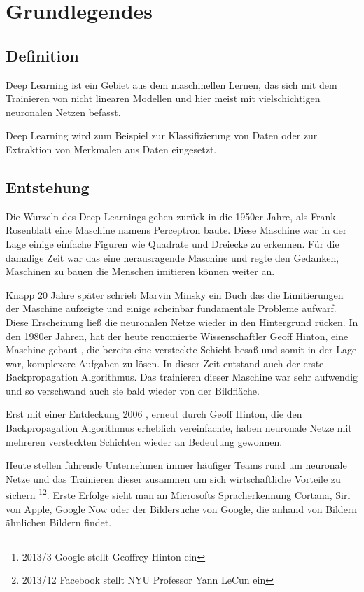 \chapter{Grundlegendes}
\label{cha:grundlegendes}

\section{Definition}

Deep Learning ist ein Gebiet aus dem maschinellen Lernen, das sich mit dem Trainieren von nicht linearen Modellen und hier meist mit vielschichtigen neuronalen Netzen befasst. 

Deep Learning wird zum Beispiel zur Klassifizierung von Daten oder zur Extraktion von Merkmalen aus Daten eingesetzt.

\section{Entstehung}
\label{cha:entstehung}

Die Wurzeln des Deep Learnings gehen zurück in die 1950er Jahre, als Frank Rosenblatt eine Maschine namens Perceptron \citep{Perceptron} baute. Diese Maschine war in der Lage einige einfache Figuren wie Quadrate und Dreiecke zu erkennen. Für die damalige Zeit war das eine herausragende Maschine und regte den Gedanken, Maschinen zu bauen die Menschen imitieren können weiter an.

Knapp 20 Jahre später schrieb Marvin Minsky \citep{PerceptronsMinsky} ein Buch das die Limitierungen der Maschine aufzeigte und einige scheinbar fundamentale Probleme aufwarf. Diese Erscheinung ließ die neuronalen Netze wieder in den Hintergrund rücken.
In den 1980er Jahren, hat der heute renomierte Wissenschaftler Geoff Hinton, eine Maschine gebaut \citep{BackpropagationEarly}, die bereits eine versteckte Schicht besaß und somit in der Lage war, komplexere Aufgaben zu lösen. In dieser Zeit entstand auch der erste Backpropagation Algorithmus. %
Das trainieren dieser Maschine war sehr aufwendig und so verschwand auch sie bald wieder von der Bildfläche. 

Erst mit einer Entdeckung 2006 \citep{BackpropagationFast}, erneut durch Geoff Hinton, die den Backpropagation Algorithmus erheblich vereinfachte, haben neuronale Netze mit mehreren versteckten Schichten wieder an Bedeutung gewonnen. 

Heute stellen führende Unternehmen immer häufiger Teams rund um neuronale Netze und das Trainieren dieser zusammen um sich wirtschaftliche Vorteile zu sichern \footnote{2013/3 Google stellt Geoffrey Hinton ein}\footnote{2013/12 Facebook stellt NYU Professor Yann LeCun ein}. Erste Erfolge sieht man an Microsofts Spracherkennung Cortana, Siri von Apple, Google Now oder der Bildersuche von Google, die anhand von Bildern ähnlichen Bildern findet.


